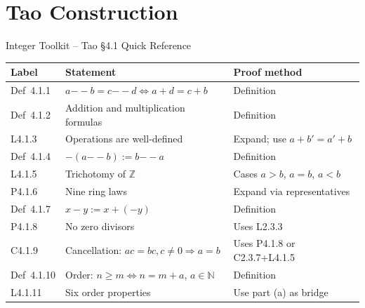 \section{Tao Construction}

\begin{toolkitbox}{Integer Toolkit -- Tao \S4.1 Quick Reference}
\small
\begin{tabular}{l l l}
\toprule
\textbf{Label} & \textbf{Statement} & \textbf{Proof method} \\
\midrule
Def~4.1.1   & $a{-\!\!-}b = c{-\!\!-}d \iff a+d=c+b$ & Definition \\
Def~4.1.2   & Addition and multiplication formulas & Definition \\
L4.1.3      & Operations are well-defined & Expand; use $a+b'=a'+b$ \\
Def~4.1.4   & $-(a{-\!\!-}b) := b{-\!\!-}a$ & Definition \\
L4.1.5      & Trichotomy of $\mathbb{Z}$ & Cases $a>b$, $a=b$, $a<b$ \\
P4.1.6      & Nine ring laws & Expand via representatives \\
Def~4.1.7   & $x - y := x + (-y)$ & Definition \\
P4.1.8      & No zero divisors & Uses L2.3.3 \\
C4.1.9      & Cancellation: $ac=bc, c\neq 0 \Rightarrow a=b$ & Uses P4.1.8 or C2.3.7+L4.1.5 \\
Def~4.1.10  & Order: $n \geq m \iff n = m+a$, $a \in \mathbb{N}$ & Definition \\
L4.1.11     & Six order properties & Use part (a) as bridge \\
\bottomrule
\end{tabular}
\end{toolkitbox}


